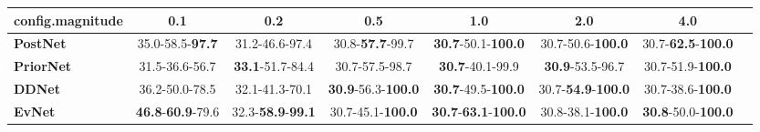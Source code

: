 \begin{tabular}{lccccccc}
\toprule
\textbf{config.magnitude} &                               0.1 &                               0.2 &                                0.5 &                                         1.0 &                                2.0 &                                4.0 \\
\midrule
\textbf{PostNet } &           35.0-58.5-\textbf{97.7} &                    31.2-46.6-97.4 &            30.8-\textbf{57.7}-99.7 &           \textbf{30.7}-50.1-\textbf{100.0} &           30.7-50.6-\textbf{100.0} &  30.7-\textbf{62.5}-\textbf{100.0} \\
\textbf{PriorNet} &                    31.5-36.6-56.7 &           \textbf{33.1}-51.7-84.4 &                     30.7-57.5-98.7 &                     \textbf{30.7}-40.1-99.9 &            \textbf{30.9}-53.5-96.7 &           30.7-51.9-\textbf{100.0} \\
\textbf{DDNet   } &                    36.2-50.0-78.5 &                    32.1-41.3-70.1 &  \textbf{30.9}-56.3-\textbf{100.0} &           \textbf{30.7}-49.5-\textbf{100.0} &  30.7-\textbf{54.9}-\textbf{100.0} &           30.7-38.6-\textbf{100.0} \\
\textbf{EvNet   } &  \textbf{46.8}-\textbf{60.9}-79.6 &  32.3-\textbf{58.9}-\textbf{99.1} &           30.7-45.1-\textbf{100.0} &  \textbf{30.7}-\textbf{63.1}-\textbf{100.0} &           30.8-38.1-\textbf{100.0} &  \textbf{30.8}-50.0-\textbf{100.0} \\
\bottomrule
\end{tabular}
